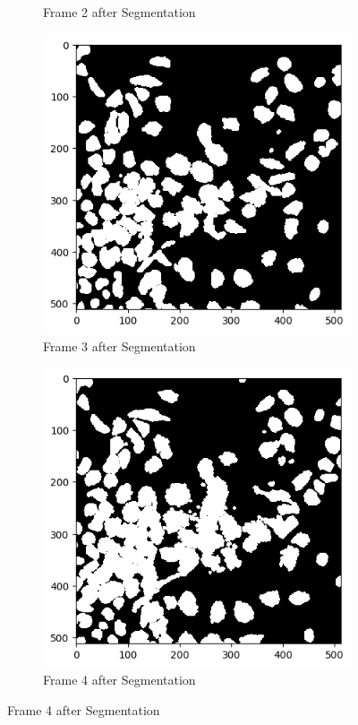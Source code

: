 \documentclass{article}
\begin{document}
\begin{figure}[h!]
\begin{subfigure}{0.4\textwidth}
    \caption*{Frame 2 after Segmentation}
  \end{subfigure}

  \begin{subfigure}{0.4\textwidth}
    \includegraphics[width=\linewidth]{Report/Appendix_Images/Segmentation-A-Control/frame_3.png}
    \caption*{Frame 3 after Segmentation}
  \end{subfigure}
  \hfill
  \begin{subfigure}{0.4\textwidth}
    \includegraphics[width=\linewidth]{Report/Appendix_Images/Segmentation-A-Control/frame_4.png}
    \caption*{Frame 4 after Segmentation}
  \end{subfigure}


\end{figure}
\end{document}
